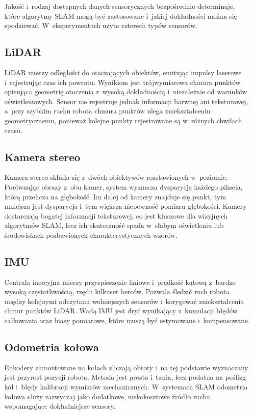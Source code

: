 Jakość i~rodzaj dostępnych danych sensorycznych bezpośrednio determinuje,
które algorytmy SLAM mogą być zastosowane i~jakiej dokładności można się spodziewać.
W~eksperymentach użyto czterech typów sensorów.

\subsection{LiDAR}

LiDAR mierzy odległości do otaczających obiektów, emitując impulsy laserowe
i~rejestrując czas ich powrotu.
Wynikiem jest trójwymiarowa chmura punktów opisująca geometrię otoczenia
z~wysoką dokładnością i~niezależnie od warunków oświetleniowych.
Sensor nie rejestruje jednak informacji barwnej ani teksturowej,
a~przy szybkim ruchu robota chmura punktów ulega zniekształceniu geometrycznemu,
ponieważ kolejne punkty rejestrowane są w~różnych chwilach czasu.

\subsection{Kamera stereo}

Kamera stereo składa się z~dwóch obiektywów rozstawionych w~poziomie.
Porównując obrazy z~obu kamer, system wyznacza dysparycję każdego piksela,
którą przelicza na głębokość.
Im dalej od kamery znajduje się punkt, tym mniejsza jest dysparycja
i~tym większa niepewność pomiaru głębokości.
Kamery dostarczają bogatej informacji teksturowej, co jest kluczowe
dla wizyjnych algorytmów SLAM, lecz ich skuteczność spada w~słabym oświetleniu
lub środowiskach pozbawionych charakterystycznych wzorów.

\subsection{IMU}

Centrala inercyjna mierzy przyspieszenie liniowe i~prędkość kątową
z~bardzo wysoką częstotliwością, rzędu kilkuset herców.
Pozwala śledzić ruch robota między kolejnymi odczytami wolniejszych sensorów
i~korygować zniekształcenia chmur punktów LiDAR.
Wadą IMU jest dryf wynikający z~kumulacji błędów całkowania oraz biasy
pomiarowe, które muszą być estymowane i~kompensowane.

\subsection{Odometria kołowa}

Enkodery zamontowane na kołach zliczają obroty i~na tej podstawie
wyznaczany jest przyrost pozycji robota.
Metoda jest prosta i~tania, lecz podatna na poślizg kół i~błędy kalibracji
wymiarów mechanicznych.
W~systemach SLAM odometria kołowa służy zazwyczaj jako dodatkowe, niskokosztowe
źródło ruchu wspomagające dokładniejsze sensory.

